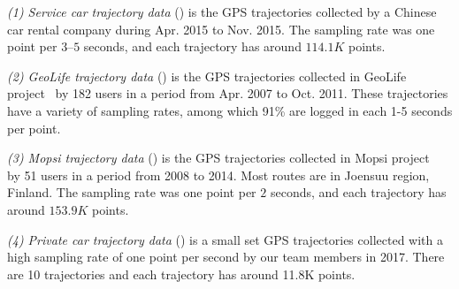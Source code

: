 
\vspace{0.5ex}
\ni \emph{(1) Service car trajectory data} (\sercar) is the GPS trajectories collected by a Chinese car rental company during Apr. 2015 to Nov. 2015. The sampling rate was one point per $3$--$5$ seconds, and each trajectory has around $114.1K$ points.

\vspace{0.5ex}
\ni \emph{(2) GeoLife trajectory data} (\geolife) is the GPS trajectories collected in GeoLife project~\cite{Web:Geolife} by 182 users in a period from Apr. 2007 to Oct. 2011. These trajectories have a variety of sampling rates, among which 91\% are logged in each 1-5 seconds per point. %

\vspace{0.5ex}
\ni \emph{(3) Mopsi trajectory data} (\mopsi) is the GPS trajectories collected in Mopsi project~\cite{Web:Mopsi} by 51 users in a period from 2008 to 2014. Most routes are in Joensuu region, Finland.
The sampling rate was one point per $2$ seconds, and each trajectory has around $153.9K$ points.

\vspace{0.5ex}
\ni \emph{(4) Private car trajectory data} (\pricar) is a small set GPS trajectories collected with a high sampling rate of one point per second by our team members in 2017. There are 10 trajectories and each trajectory has around 11.8K points.



